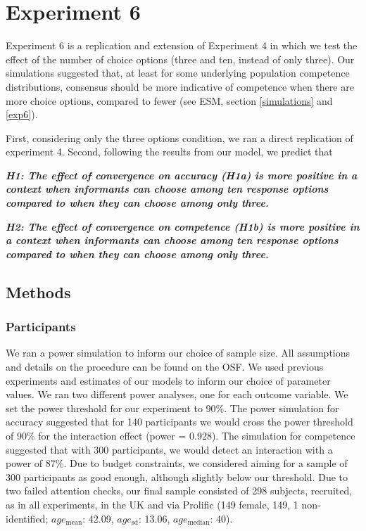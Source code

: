 \documentclass[
  doc,floatsintext]{apa6}
\begin{document}
\section{Experiment 6}\label{experiment-6}

Experiment 6 is a replication and extension of Experiment 4 in which we test the effect of the number of choice options (three and ten, instead of only three). Our simulations suggested that, at least for some underlying population competence distributions, consensus should be more indicative of competence when there are more choice options, compared to fewer (see ESM, section \ref{simulations} and \ref{exp6}).

First, considering only the three options condition, we ran a direct replication of experiment 4. Second, following the results from our model, we predict that

\textbf{\emph{H1: The effect of convergence on accuracy (H1a) is more positive in a context when informants can choose among ten response options compared to when they can choose among only three.}}

\textbf{\emph{H2: The effect of convergence on competence (H1b) is more positive in a context when informants can choose among ten response options compared to when they can choose among only three.}}

\subsection{Methods}\label{methods-5}

\subsubsection{Participants}\label{participants-5}

We ran a power simulation to inform our choice of sample size. All assumptions and details on the procedure can be found on the OSF. We used previous experiments and estimates of our models to inform our choice of parameter values. We ran two different power analyses, one for each outcome variable. We set the power threshold for our experiment to 90\%. The power simulation for accuracy suggested that for 140 participants we would cross the power threshold of 90\% for the interaction effect (power = 0.928). The simulation for competence suggested that with 300 participants, we would detect an interaction with a power of 87\%. Due to budget constraints, we considered aiming for a sample of 300 participants as good enough, although slightly below our threshold. Due to two failed attention checks, our final sample consisted of 298 subjects, recruited, as in all experiments, in the UK and via Prolific (149 female, 149, 1 non-identified; \(age_\text{mean}\): 42.09, \(age_\text{sd}\): 13.06, \(age_\text{median}\): 40).
\end{document}
